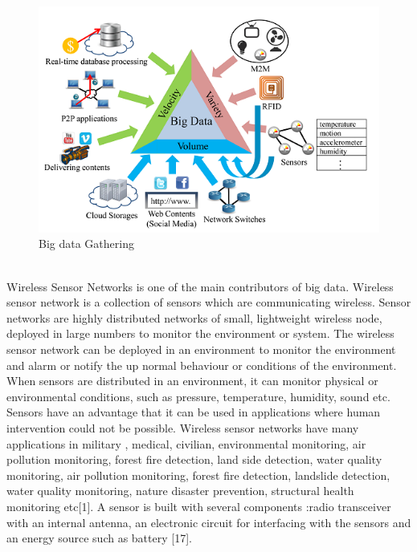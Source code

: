 \documentclass[MTech]{iitmdiss}
\begin{document}
\begin{figure}[ht!]
\centering
\includegraphics[scale=0.8]{bigdata2.PNG}
\caption{Big data Gathering\label{overflow}}
\label{f1}
\end{figure}\\
Wireless Sensor Networks is one of the main contributors of big data. Wireless sensor network is a collection of sensors which are communicating wireless. Sensor networks are highly distributed networks of small, lightweight wireless node, deployed in large numbers to monitor the environment or system. The wireless sensor network can be deployed in an environment to monitor the environment and alarm or notify the up normal behaviour or conditions of the environment. When sensors are distributed in an environment, it can monitor physical or environmental conditions, such as pressure, temperature, humidity, sound etc. Sensors have an advantage that it can be used in applications where human intervention could not be possible. Wireless sensor networks have many applications in military , medical, civilian, environmental monitoring, air pollution monitoring, forest fire detection, land side detection, water quality monitoring, air pollution monitoring, forest fire detection, landslide detection, water quality monitoring, nature disaster prevention, structural health monitoring etc[1]. A sensor is built with several components :radio transceiver with an internal antenna, an electronic circuit for interfacing with the sensors and an energy source such as battery [17].
\end{document}

